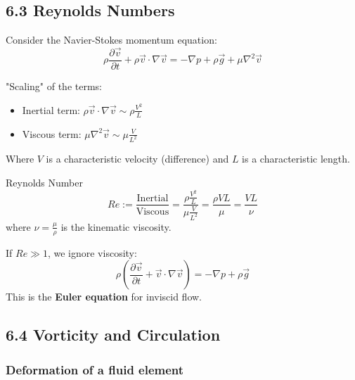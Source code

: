 \subsection{6.3 Reynolds Numbers}

Consider the Navier-Stokes momentum equation:
$$ \rho \frac{\partial \vec{v}}{\partial t} + \rho \vec{v} \cdot \nabla \vec{v} = -\nabla p + \rho \vec{g} + \mu \nabla^2 \vec{v} $$

"Scaling" of the terms:
\begin{itemize}
    \item Inertial term: $\rho \vec{v} \cdot \nabla \vec{v} \sim \rho \frac{V^2}{L}$
    \item Viscous term: $\mu \nabla^2 \vec{v} \sim \mu \frac{V}{L^2}$
\end{itemize}
Where $V$ is a characteristic velocity (difference) and $L$ is a characteristic length.

\begin{eqbox}{Reynolds Number}
$$ Re := \frac{\text{Inertial}}{\text{Viscous}} = \frac{\rho \frac{V^2}{L}}{\mu \frac{V}{L^2}} = \frac{\rho V L}{\mu} = \frac{V L}{\nu} $$
where $\nu = \frac{\mu}{\rho}$ is the kinematic viscosity.
\end{eqbox}

If $Re \gg 1$, we ignore viscosity:
$$ \rho \left( \frac{\partial \vec{v}}{\partial t} + \vec{v} \cdot \nabla \vec{v} \right) = -\nabla p + \rho \vec{g} $$
This is the \textbf{Euler equation} for inviscid flow.

\newpage
\subsection{6.4 Vorticity and Circulation}

\subsubsection{Deformation of a fluid element}

\begin{center}
\end{center}

